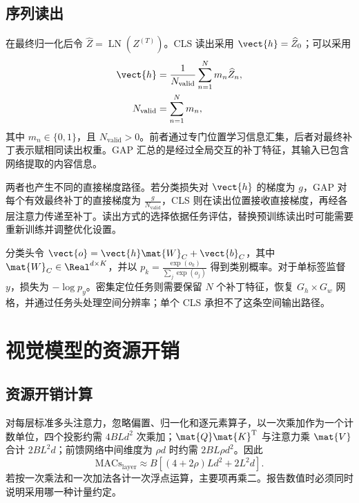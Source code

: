 \documentclass[../textbook.tex]{subfiles}
\begin{document}
\subsection{序列读出}
在最终归一化后令 $\widehat Z=\operatorname{LN}(Z^{(T)})$。CLS 读出采用 $\vect{h}=\widehat Z_0$；可以采用
\begin{equation}\label{eq:vit-pooling}
 \begin{aligned}
  \vect{h}&=\frac{1}{N_{\mathrm{valid}}}\sum_{n=1}^{N}m_n\widehat Z_n,\\
  N_{\mathrm{valid}}&=\sum_{n=1}^{N}m_n,
 \end{aligned}
\end{equation}
其中 $m_n\in\{0,1\}$，且 $N_{\mathrm{valid}}>0$。前者通过专门位置学习信息汇集，后者对最终补丁表示赋相同读出权重。GAP 汇总的是经过全局交互的补丁特征，其输入已包含网络提取的内容信息。

两者也产生不同的直接梯度路径。若分类损失对 $\vect{h}$ 的梯度为 $g$，GAP 对每个有效最终补丁的直接梯度为 $\frac{g}{N_{\mathrm{valid}}}$，CLS 则在读出位置接收直接梯度，再经各层注意力传递至补丁。读出方式的选择依据任务评估，替换预训练读出时可能需要重新训练并调整优化设置。

分类头令 $\vect{o}=\vect{h}\mat{W}_C+\vect{b}_C$，其中 $\mat{W}_C\in\Real^{d\times K}$，并以 $p_k=\frac{\exp(o_k)}{\sum_j\exp(o_j)}$ 得到类别概率。对于单标签监督 $y$，损失为 $-\log p_y$。密集定位任务则需要保留 $N$ 个补丁特征，恢复 $G_h\times G_w$ 网格，并通过任务头处理空间分辨率；单个 CLS 承担不了这条空间输出路径。

\section{视觉模型的资源开销}

\subsection{资源开销计算}
对每层标准多头注意力，忽略偏置、归一化和逐元素算子，以一次乘加作为一个计数单位，四个投影约需 $4BLd^2$ 次乘加；$\mat{Q}\mat{K}^{\mathrm{T}}$ 与注意力乘 $\mat{V}$ 合计 $2BL^2d$；前馈网络中间维度为 $\rho d$ 时约需 $2B L\rho d^2$。因此
\begin{equation}
 \mathrm{MACs}_{\mathrm{layer}}\approx
 B\left[(4+2\rho)Ld^2+2L^2d\right].
 \label{eq:vit-cost}
\end{equation}
若按一次乘法和一次加法各计一次浮点运算，主要项再乘二。报告数值时必须同时说明采用哪一种计量约定。
\end{document}
